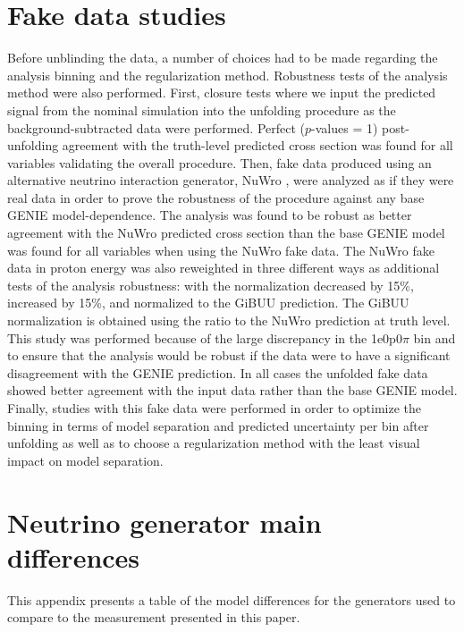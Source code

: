 \documentclass[amsmath,amssymb,aps,prd,showpacs,twocolumn,superscriptaddress,letterpaper,longbibliography, floatfix]{revtex4-2}
\begin{document}
\section{Fake data studies}
\label{sec:fakedata}
Before unblinding the data, a number of choices had to be made regarding the analysis binning and the regularization method. Robustness tests of the analysis method were also performed. First, closure tests where we input the predicted signal from the nominal simulation into the unfolding procedure as the background-subtracted data were performed. Perfect ($p$-values = 1) post-unfolding agreement with the truth-level predicted cross section was found for all variables validating the overall procedure. Then, fake data produced using an alternative neutrino interaction generator, NuWro \cite{NuWro}, were analyzed as if they were real data in order to prove the robustness of the procedure against any base GENIE model-dependence. 
The analysis was found to be robust as better agreement with the NuWro predicted cross section than the base GENIE model was found for all variables when using the NuWro fake data.   
The NuWro fake data in proton energy was also reweighted in three different ways as additional tests of the analysis robustness: with the normalization decreased by 15\%, increased by 15\%, and normalized to the GiBUU prediction. The GiBUU normalization is obtained using the ratio to the NuWro prediction at truth level. This study was performed because of the large discrepancy in the 1e0p0$\pi$ bin and to ensure that the analysis would be robust if the data were to have a significant disagreement with the GENIE prediction.
In all cases the unfolded fake data showed better agreement with the input data rather than the base GENIE model. Finally, studies with this fake data were performed in order to optimize the binning in terms of model separation and predicted uncertainty per bin after unfolding as well as to choose a regularization method with the least visual impact on model separation.

\FloatBarrier

\section{Neutrino generator main differences}

This appendix presents a table of the model differences for the generators used to compare to the measurement presented in this paper.
\end{document}
